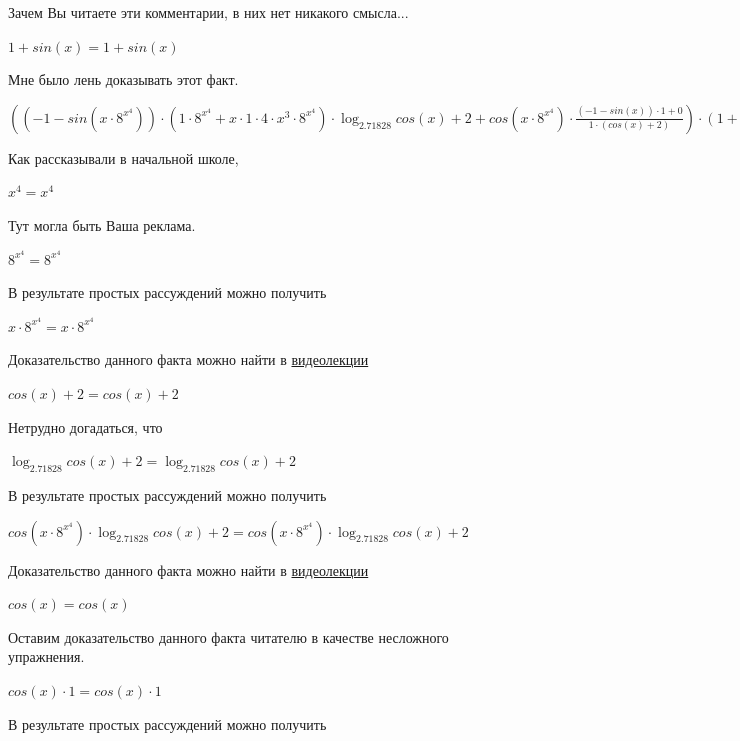 \documentclass[12pt,a4paper,fleqn]{article}
\theoremstyle{definition}
\begin{document}
Зачем Вы читаете эти комментарии, в них нет никакого смысла... 

$ 1  + sin( x ) =  1  + sin( x )$

Мне было лень доказывать этот факт.

$(( -1  - sin( x  \cdot { 8 }^{{ x }^{ 4 }})) \cdot ( 1  \cdot { 8 }^{{ x }^{ 4 }} +  x  \cdot  1  \cdot  4  \cdot { x }^{ 3 } \cdot { 8 }^{{ x }^{ 4 }}) \cdot \log_{ 2.71828 }{cos( x ) +  2 } + cos( x  \cdot { 8 }^{{ x }^{ 4 }}) \cdot \frac{( -1  - sin( x )) \cdot  1  +  0 }{ 1  \cdot (cos( x ) +  2 )}
) \cdot ( 1  + sin( x )) = (( -1  - sin( x  \cdot { 8 }^{{ x }^{ 4 }})) \cdot ( 1  \cdot { 8 }^{{ x }^{ 4 }} +  x  \cdot  1  \cdot  4  \cdot { x }^{ 3 } \cdot { 8 }^{{ x }^{ 4 }}) \cdot \log_{ 2.71828 }{cos( x ) +  2 } + cos( x  \cdot { 8 }^{{ x }^{ 4 }}) \cdot \frac{( -1  - sin( x )) \cdot  1  +  0 }{ 1  \cdot (cos( x ) +  2 )}
) \cdot ( 1  + sin( x ))$

Как рассказывали в начальной школе, 

${ x }^{ 4 } = { x }^{ 4 }$

Тут могла быть Ваша реклама. 

${ 8 }^{{ x }^{ 4 }} = { 8 }^{{ x }^{ 4 }}$

В результате простых рассуждений можно получить 

$ x  \cdot { 8 }^{{ x }^{ 4 }} =  x  \cdot { 8 }^{{ x }^{ 4 }}$

Доказательство данного факта можно найти в \href{https://www.youtube.com/watch?v=dQw4w9WgXcQ}{видеолекции} 

$cos( x ) +  2  = cos( x ) +  2 $

Нетрудно догадаться, что 

$\log_{ 2.71828 }{cos( x ) +  2 } = \log_{ 2.71828 }{cos( x ) +  2 }$

В результате простых рассуждений можно получить 

$cos( x  \cdot { 8 }^{{ x }^{ 4 }}) \cdot \log_{ 2.71828 }{cos( x ) +  2 } = cos( x  \cdot { 8 }^{{ x }^{ 4 }}) \cdot \log_{ 2.71828 }{cos( x ) +  2 }$

Доказательство данного факта можно найти в \href{https://www.youtube.com/watch?v=dQw4w9WgXcQ}{видеолекции} 

$cos( x ) = cos( x )$

Оставим доказательство данного факта читателю в качестве несложного упражнения. 

$cos( x ) \cdot  1  = cos( x ) \cdot  1 $

В результате простых рассуждений можно получить 
\end{document}
